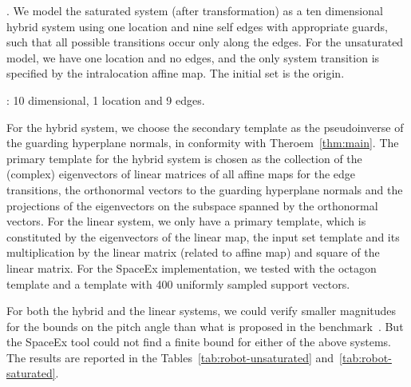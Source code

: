 .  We model the saturated system (after transformation)
as a ten dimensional hybrid system using one location and nine self
edges with appropriate guards, such that all possible transitions
occur only along the edges.  For the unsaturated model, we have one
location and no edges, and the only system transition is specified by
the intralocation affine map.  The initial set is the origin.

: 10 dimensional, 1 location and 9 edges.

  For the hybrid system, we choose the secondary
template as the pseudoinverse of the guarding hyperplane normals, in
conformity with Theroem~\ref{thm:main}.  The primary template for the
hybrid system is chosen as the collection of the (complex) eigenvectors of
linear matrices of all affine maps for the edge transitions, the
orthonormal vectors to the guarding hyperplane normals and the
projections of the eigenvectors on the subspace spanned by the
orthonormal vectors.  For the linear system, we only have a primary
template, which is constituted by the eigenvectors of the linear map,
the input set template and its multiplication by the linear matrix
(related to affine map) and square of the linear matrix.  For the
SpaceEx implementation, we tested with the octagon template and a
template with 400 uniformly sampled support vectors.


  For both the hybrid and the linear systems, we could
verify smaller magnitudes for the bounds on the pitch angle than what
is proposed in the benchmark~\cite{heinz2014benchmark}.  But the
SpaceEx tool could not find a finite bound for either of the above
systems.  The results are reported in the
Tables~\ref{tab:robot-unsaturated} and~\ref{tab:robot-saturated}.

